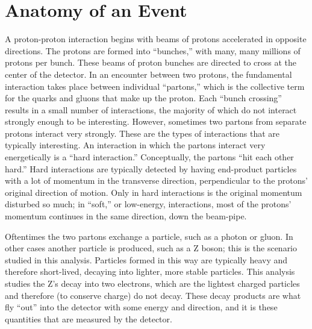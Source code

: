 \section{Anatomy of an Event}
\label{over:anatomy}


A proton-proton interaction begins 
with beams of protons accelerated 
in opposite directions.  
The protons are formed into ``bunches,'' 
with many, many millions of protons per bunch.  
These beams of proton bunches are directed to 
cross at the center of the detector.  
In an encounter between two protons, 
the fundamental interaction takes place 
between individual ``partons,'' 
which is the collective term for 
the quarks and gluons that make up the proton.  
Each ``bunch crossing'' results in 
a small number of interactions, 
the majority of which do not interact 
strongly enough to be interesting.  
However, sometimes two partons %
from separate protons interact very strongly.  
These are the types of interactions 
that are typically interesting.  
An interaction in which the partons interact 
very energetically is a ``hard interaction.''  
Conceptually, the partons ``hit each other hard.''  
Hard interactions are typically detected 
by having end-product particles with 
a lot of momentum 
in the transverse direction, 
perpendicular to the protons' original 
direction of motion.  
Only in hard interactions is the original 
momentum disturbed so much; 
in ``soft,'' or low-energy, interactions, 
most of the protons' momentum 
continues in the same direction, 
down the beam-pipe.  

Oftentimes the two partons exchange 
a particle, such as a photon or gluon.  
In other cases another particle is produced, %
such as a Z boson; 
this is the scenario 
studied in this analysis.  
Particles formed in this way 
are typically heavy and therefore 
short-lived, 
decaying into lighter, more stable particles.  
This analysis studies the Z's decay into two 
electrons, 
which are the lightest charged particles 
and therefore (to conserve charge) 
do not decay.  
These decay products are what fly ``out'' 
into the detector with 
some energy and direction, 
and it is these quantities 
that are measured by the detector.  

